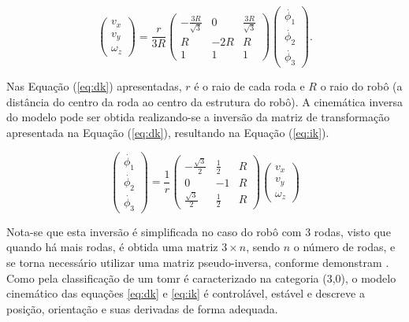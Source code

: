 \begin{equation}
  \begin{pmatrix}
    v_x \\
    v_y \\
    \omega_z
  \end{pmatrix}
  =
  \frac{r}{3R}
  \begin{pmatrix}
    -\frac{3R}{\sqrt{3}} & 0   & \frac{3R}{\sqrt{3}} \\
    R                    & -2R & R                   \\
    1                    & 1   & 1
  \end{pmatrix}
  \begin{pmatrix}
    \dot{\phi_1} \\
    \dot{\phi_2} \\
    \dot{\phi_3}
  \end{pmatrix}.
  \label{eq:dk}
\end{equation}

Nas Equação (\ref{eq:dk}) apresentadas, $r$ é o raio de cada roda e $R$ o raio do robô (a distância do centro da roda ao centro da estrutura do robô). A cinemática inversa do modelo pode ser obtida realizando-se a inversão da matriz de transformação apresentada na Equação (\ref{eq:dk}), resultando na Equação (\ref{eq:ik}).


\begin{equation}
  \begin{pmatrix}
    \dot{\phi_1} \\
    \dot{\phi_2} \\
    \dot{\phi_3}
  \end{pmatrix}
  =
  \frac{1}{r}
  \begin{pmatrix}
    -\frac{\sqrt{3}}{2} & \frac{1}{2} & R \\
    0                   & -1          & R \\
    \frac{\sqrt{3}}{2}  & \frac{1}{2} & R
  \end{pmatrix}
  \begin{pmatrix}
    v_x \\
    v_y \\
    \omega_z
  \end{pmatrix}
  \label{eq:ik}
\end{equation}

Nota-se que esta inversão é simplificada no caso do robô com 3 rodas, visto que quando há mais rodas, é obtida uma matriz $3 \times n$, sendo $n$ o número de rodas, e se torna necessário utilizar uma matriz pseudo-inversa, conforme demonstram \citet{rojas2006holonomic}. Como pela classificação de \citet{campion1996structural} um \acrshort{tomr} é caracterizado na categoria (3,0), o modelo cinemático das equações \ref{eq:dk} e \ref{eq:ik} é controlável, estável e descreve a posição, orientação e suas derivadas de forma adequada. %

